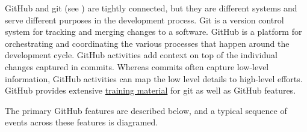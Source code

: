 \documentclass[]{nrel}
\begin{document}
GitHub and git (see ) are tightly connected, but they are different
systems and serve different purposes in the development process.
Git is a version control system for tracking and merging changes to a software.
GitHub is a platform for orchestrating and coordinating the various processes that happen
around the development cycle.
GitHub activities add context on top of the individual changes captured in commits.
Whereas commits often capture low-level information, GitHub activities can map the low level
details to high-level efforts.
GitHub provides extensive \href{https://docs.github.com/en/get-started/quickstart/git-and-github-learning-resources}{training material}
for git as well as GitHub features.

The primary GitHub features are described below, and a typical sequence of events across these
features is diagramed.
\end{document}
